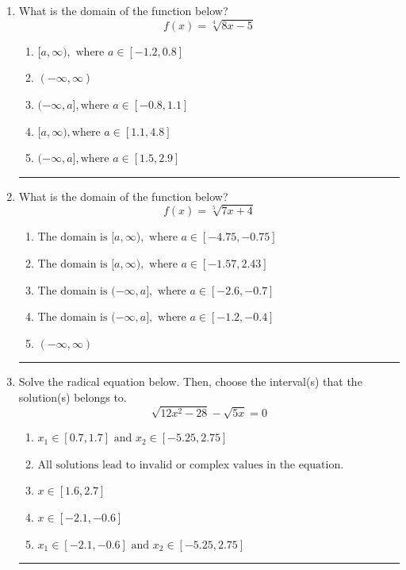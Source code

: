 \documentclass[14pt]{extbook}
\newcommand{\litem}[1]{\item#1\hspace*{-1cm}\rule{\textwidth}{0.4pt}}
\begin{document}
\begin{enumerate}
{\begin{enumerate}[label=\Alph*.]
\end{enumerate} }
\litem{
What is the domain of the function below?\[ f(x) = \sqrt[4]{8 x - 5} \]\begin{enumerate}[label=\Alph*.]
\item \( [a, \infty), \text{ where } a \in [-1.2, 0.8] \)
\item \( (-\infty, \infty) \)
\item \( (-\infty, a], \text{where } a \in [-0.8, 1.1] \)
\item \( [a, \infty), \text{where } a \in [1.1, 4.8] \)
\item \( (-\infty, a], \text{where } a \in [1.5, 2.9] \)

\end{enumerate} }
\litem{
What is the domain of the function below?\[ f(x) = \sqrt[5]{7 x + 4} \]\begin{enumerate}[label=\Alph*.]
\item \( \text{The domain is } [a, \infty), \text{   where } a \in [-4.75, -0.75] \)
\item \( \text{The domain is } [a, \infty), \text{   where } a \in [-1.57, 2.43] \)
\item \( \text{The domain is } (-\infty, a], \text{   where } a \in [-2.6, -0.7] \)
\item \( \text{The domain is } (-\infty, a], \text{   where } a \in [-1.2, -0.4] \)
\item \( (-\infty, \infty) \)

\end{enumerate} }
\litem{
Solve the radical equation below. Then, choose the interval(s) that the solution(s) belongs to.\[ \sqrt{12 x^2 - 28} - \sqrt{5 x} = 0 \]\begin{enumerate}[label=\Alph*.]
\item \( x_1 \in [0.7, 1.7] \text{ and } x_2 \in [-5.25,2.75] \)
\item \( \text{All solutions lead to invalid or complex values in the equation.} \)
\item \( x \in [1.6,2.7] \)
\item \( x \in [-2.1,-0.6] \)
\item \( x_1 \in [-2.1, -0.6] \text{ and } x_2 \in [-5.25,2.75] \)


\end{enumerate}}
\end{enumerate}
\end{document}
